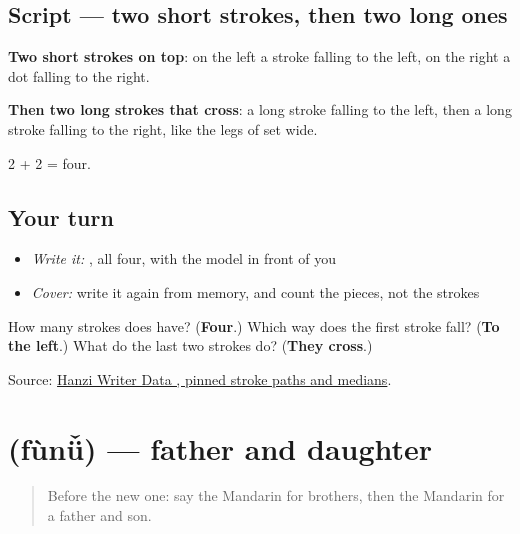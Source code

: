 \subsection*{Script — two short strokes, then two long ones}

\begin{quote}
\end{quote}

\textbf{Two short strokes on top}: on the left a stroke falling to the left, on the right a dot falling to the right.

\textbf{Then two long strokes that cross}: a long stroke falling to the left, then a long stroke falling to the right, like the legs of  set wide.

2 + 2 = four.

\subsection*{Your turn}
\begin{itemize}
\raggedright
  \item \emph{Write it:} , all four, with the model in front of you
  \item \emph{Cover:} write it again from memory, and count the pieces, not the strokes
\end{itemize}

\begin{tcolorbox}[breakable,colback=teal!4,colframe=teal!35!black,title={Before you move on}]
How many strokes does  have? (\textbf{Four}.) Which way does the first stroke fall? (\textbf{To the left}.) What do the last two strokes do? (\textbf{They cross}.)

Source: \href{https://raw.githubusercontent.com/chanind/hanzi-writer-data/68d10a4b21150cae5e1ebbd223eed289cf32d90c/data/\%E7\%88\%B6.json}{Hanzi Writer Data , pinned stroke paths and medians}.
\end{tcolorbox}
\section[\texorpdfstring{\zh{父女} (fùnǚ)}{父女 (fùnǚ)}]{ (fùnǚ) — father and daughter}

\label{lesson:ZH-C507-funu}



\begin{quote}
Before the new one: say the Mandarin for brothers, then the Mandarin for a father and son.
\end{quote}

